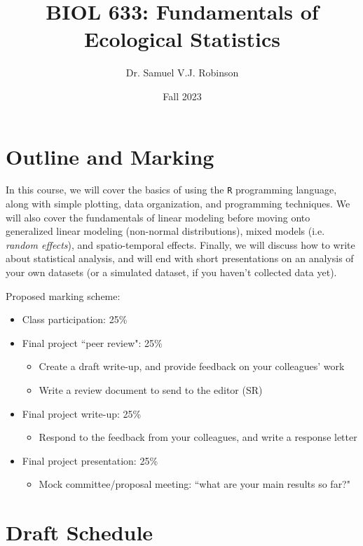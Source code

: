 \documentclass[11pt]{article}
\title{BIOL 633: Fundamentals of Ecological Statistics}
\author{Dr. Samuel V.J. Robinson}
\date{Fall 2023}
\begin{document}
\maketitle

\section*{Outline and Marking}

\large
In this course, we will cover the basics of using the \texttt{R} programming language, along with simple plotting, data organization, and programming techniques. We will also cover the fundamentals of linear modeling before moving onto generalized linear modeling (non-normal distributions), mixed models (i.e. \textit{random effects}), and spatio-temporal effects. Finally, we will discuss how to write about statistical analysis, and will end with short presentations on an analysis of your own datasets (or a simulated dataset, if you haven't collected data yet).

\vspace{1cm}

Proposed marking scheme:
\begin{itemize}
  \item Class participation: 25\%
  \item Final project ``peer review": 25\%
  \begin{itemize}
    \item Create a draft write-up, and provide feedback on your colleagues' work
    \item Write a review document to send to the editor (SR)
  \end{itemize}
  \item Final project write-up: 25\%
  \begin{itemize}
    \item Respond to the feedback from your colleagues, and write a response letter
  \end{itemize}
  \item Final project presentation: 25\%
  \begin{itemize}
    \item Mock committee/proposal meeting: ``what are your main results so far?"
  \end{itemize}
\end{itemize}

\clearpage

\section*{Draft Schedule}
\end{document}
